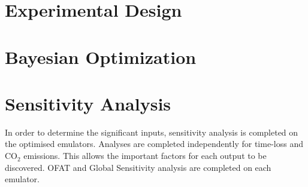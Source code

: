 \documentclass{article}
\newcommand{\harry}[1]{\sethlcolor{green}\hl{[Harry: #1]}}
\newcommand{\harry}[1]{}
\begin{document}





\section{Experimental Design}
\label{sec:experimental-design}



\section{Bayesian Optimization}
\label{sec:bay_opt}


\section{Sensitivity Analysis}
\label{sec:sensitivity_analysis}

In order to determine the significant inputs, sensitivity analysis is completed on the optimised emulators. Analyses are completed independently for time-loss and CO$_2$ emissions. This allows the important factors for each output to be discovered. OFAT and Global Sensitivity analysis are completed on each emulator.
\end{document}

